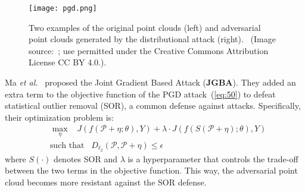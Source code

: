 \documentclass{ieeeaccess}
\def\etal{\textit{et al.}}
\begin{document}
 
\begin{figure}
    \centering
    \texttt{[image: pgd.png]}
    \caption{Two examples of the original point clouds (left) and adversarial point clouds generated by the distributional attack (right).~\cite{liu2020adversarial} (Image source:~\cite{liu2020adversarial}; use permitted under the Creative Commons Attribution License CC BY 4.0.).}
    \label{fig_PGD}
\end{figure}


Ma \etal~\cite{ma2020efficient} proposed the Joint Gradient Based Attack (\textbf{JGBA}). They added an extra term to the objective function of the PGD attack~(\ref{eq:50}) to defeat statistical outlier removal (SOR), a common defense against attacks. 
Specifically, their optimization problem is:
\begin{equation}
\begin{split}
&\max\limits_\eta  \;\;\;    J(f(\mathcal{P}+\eta;\theta),Y) + \lambda \cdot J(f(S( \mathcal{P}+\eta);\theta),Y)   \\
&\text{such that} \;\;\; D_{\ell_2} (\mathcal{P} , \mathcal{P}+\eta) \leq \epsilon
 \end{split}
\label{eq:5000}
\end{equation}where $S(\cdot)$ denotes SOR and $\lambda$ is a hyperparameter that controls the trade-off between the two terms in the objective function. This way, the adversarial point cloud becomes more resistant against the SOR defense.
\end{document}
